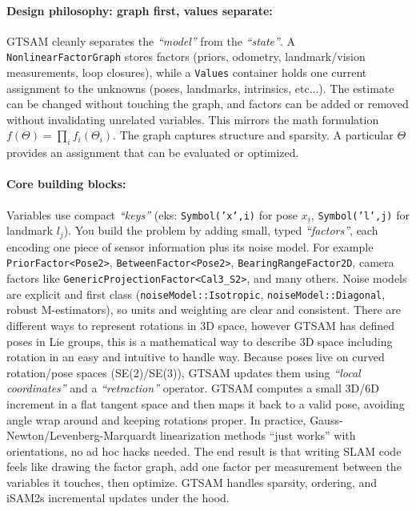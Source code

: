 \paragraph{Design philosophy: graph first, values separate:}
GTSAM cleanly separates the \textit{``model''} from the \textit{``state''}. A \texttt{NonlinearFactorGraph} stores factors (priors, odometry, landmark/vision measurements, loop closures), while a \texttt{Values} container holds one current assignment to the unknowns (poses, landmarks, intrinsics, etc...). The estimate can be changed without touching the graph, and factors can be added or removed without invalidating unrelated variables. This mirrors the math formulation $f(\Theta)=\prod_i f_i(\Theta_i)$. The graph captures structure and sparsity. A particular $\Theta$ provides an assignment that can be evaluated or optimized. \cite{GTSAM_handbook}

\paragraph{Core building blocks:}
Variables use compact \textit{``keys''} (eks: \texttt{Symbol('x',i)} for pose $x_i$, \texttt{Symbol('l',j)} for landmark $l_j$). You build the problem by adding small, typed \textit{``factors''}, each encoding one piece of sensor information plus its noise model. For example \texttt{PriorFactor<Pose2>}, \texttt{BetweenFactor<Pose2>}, \texttt{BearingRangeFactor2D}, camera factors like \texttt{GenericProjectionFactor<Cal3\_S2>}, and many others. Noise models are explicit and first class (\texttt{noiseModel::Isotropic}, \texttt{noiseModel::Diagonal}, robust M-estimators), so units and weighting are clear and consistent. There are different ways to represent rotations in 3D space, however GTSAM has defined poses in Lie groups, this is a mathematical way to describe 3D space including rotation in an easy and intuitive to handle way. Because poses live on curved rotation/pose spaces (SE(2)/SE(3)), GTSAM updates them using \textit{``local coordinates''} and a \textit{``retraction''} operator. GTSAM computes a small 3D/6D increment in a flat tangent space and then maps it back to a valid pose, avoiding angle wrap around and keeping rotations proper. In practice, Gauss-Newton/Levenberg-Marquardt linearization methods ``just works'' with orientations, no ad hoc hacks needed. The end result is that writing SLAM code feels like drawing the factor graph, add one factor per measurement between the variables it touches, then optimize. GTSAM handles sparsity, ordering, and iSAM2s incremental updates under the hood. \cite{GTSAM_handbook}

